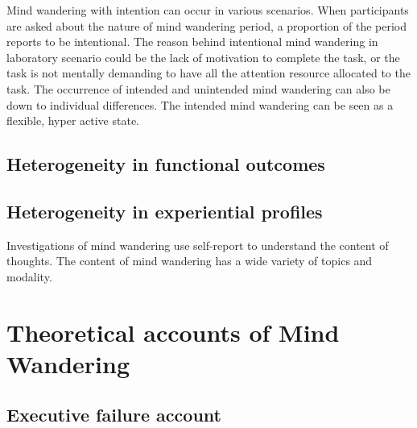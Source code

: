 Mind wandering with intention can occur in various scenarios. When participants are asked about the nature of mind wandering period, a proportion of the period reports to be intentional. The reason behind intentional mind wandering in laboratory scenario could be the lack of motivation to complete the task, or the task is not mentally demanding to have all the attention resource allocated to the task. The occurrence of intended and unintended mind wandering can also be down to individual differences. 
The intended mind wandering can be seen as a flexible, hyper active state. 

\subsection{Heterogeneity in functional outcomes}

\cite{McVayJOEP2009}
\cite{MrazekJoEP2012}

\cite{Smallwood2008}
\cite{McVay2012}
\cite{Unsworth2013}

\cite{Killingsworth2010}
\cite{Smallwood2007}

\cite{Baird2012}
\cite{Smeekens2016}

\cite{RubyPlos2013}
\cite{Poerio2016}

\cite{Medea2016}
\cite{DArgembeau2006}


\subsection{Heterogeneity in experiential profiles }
Investigations of mind wandering use self-report to understand the content of thoughts. The content of mind wandering has a wide variety of topics and modality.  
\cite{Baird2011}
\cite{Smallwood2011}

\cite{RubyFP2013} 
\cite{RubyPlos2013}
\cite{Gorgolewski2014}
\cite{Smallwood2016}



\section{Theoretical accounts of Mind Wandering}
\subsection{Executive failure account}
\cite{Kane2012}
\cite{McVayJOEP2009}

